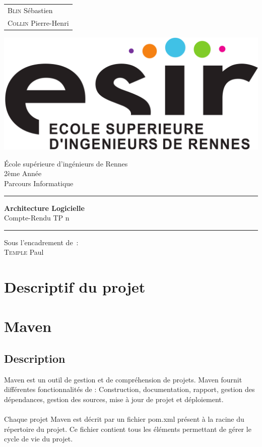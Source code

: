 \documentclass{article}
\begin{document}
\begin{titlepage}
	\vspace{-20px}
	\begin{tabular}{l}
		\textsc{Blin} Sébastien\\
		\textsc{Collin} Pierre-Henri
	\end{tabular}
	\hfill \vspace{10px}\includegraphics[scale=0.1]{../../../esir.png}\\
	\vfill
	\begin{center}
		\Huge{École supérieure d'ingénieurs de Rennes}\\
		\vspace{1cm}
		\LARGE{2ème Année}\\
		\large{Parcours Informatique}\\
		\vspace{0.5cm}\hrule\vspace{0.5cm}
		\LARGE{\textbf{Architecture Logicielle}}\\
		\Large{Compte-Rendu TP n}
		\vspace{0.5cm}\hrule
		\vfill
		\vfill
	\end{center}
	\begin{flushleft}
		\Large{Sous l'encadrement de~:}\\
		\vspace{0.2cm}
		\large{\textsc{Temple} Paul}
	\end{flushleft}
	\vfill
\end{titlepage}

\section{Descriptif du projet}

\section{Maven}
\subsection{Description}
Maven est un outil de gestion et de compréhension de projets. Maven fournit différentes fonctionnalités de :
Construction, documentation, rapport, gestion des dépendances, gestion des sources, mise à jour de projet et déploiement. \\\\
Chaque projet Maven est décrit par un fichier pom.xml présent à la racine du répertoire du projet. Ce fichier
contient tous les éléments permettant de gérer le cycle de vie du projet.
\end{document}
